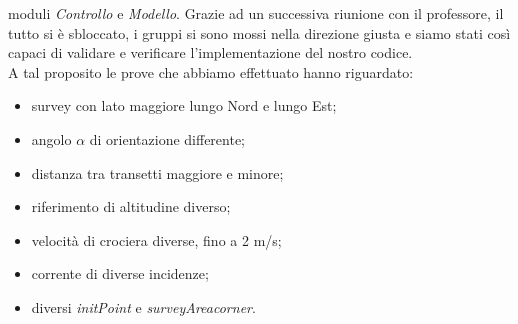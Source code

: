 \documentclass{article}
\begin{document}
            moduli \emph{Controllo}
            e \emph{Modello}. Grazie ad un successiva riunione con il professore, il tutto si è sbloccato, i gruppi si sono mossi nella direzione giusta
            e siamo stati così capaci di validare e verificare l'implementazione del nostro codice.\\
            A tal proposito le prove che abbiamo effettuato hanno riguardato:
            \begin{itemize}
                \item survey con lato maggiore lungo Nord e lungo Est; \\
                \item angolo $\alpha$ di orientazione differente; \\
                \item distanza tra transetti maggiore e minore;\\
                \item riferimento di altitudine diverso;\\
                \item velocità di crociera diverse, fino a 2 m/s;\\
                \item corrente di diverse incidenze;\\
                \item diversi \emph{initPoint} e  \emph{surveyAreacorner}.\\
            \end{itemize}
            
\end{document}
